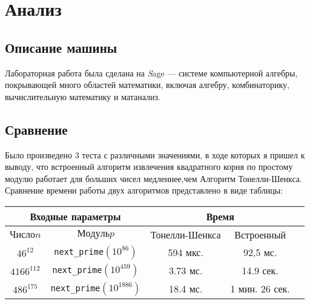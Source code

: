 \documentclass[11pt]{article}
\begin{document}
\newpage

\section{Анализ}
\subsection{Описание машины}

Лабораторная работа была сделана на {\textit Sage} — системе компьютерной алгебры, покрывающей много областей математики, включая алгебру, комбинаторику, вычислительную математику и матанализ.

\subsection{Сравнение}
Было произведено 3 теста с различными значениями, в ходе которых я пришел к выводу, что встроенный алгоритм извлечения квадратного корня по простому модулю работает для больших чисел медленнее,чем Алгоритм Тонелли-Шенкса. Сравнение времени работы двух алгоритмов представлено в виде таблицы: 
\\

\begin{center}
\begin{tabular}{|c|c|c|c|c|}
	\hline
	
	\multicolumn{2}{|c|}{Входные параметры} & \multicolumn{2}{|c|}{Время}\\
	\hline
	$Число n$ & $Модуль p$ & Тонелли-Шенкса & Встроенный\\[5pt] 
	\hline
	$46^{12}$ & \verb|next_prime|$(10^{86})$ & 594 мкс. & 92,5 мс.\\
	\hline
	$4166^{112}$ & \verb|next_prime|$(10^{459})$ & 3.73 мс. & 14.9 сек.\\
	\hline
    $486^{175}$ & \verb|next_prime|$(10^{1886})$ & 18.4 мс. & 1 мин. 26 сек.\\
	\hline	
\end{tabular}	
\end{center}
\end{document}
